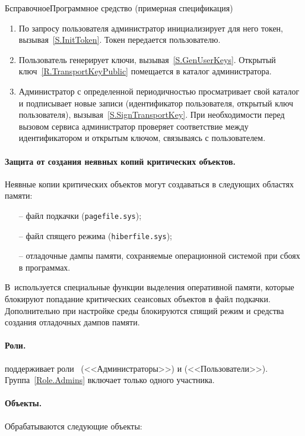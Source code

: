 \begin{appendix}{Б}{справочное}{Программное средство \CryptoDisk 
(примерная спецификация)}
\begin{enumerate}
\item
По запросу пользователя администратор инициализирует для него токен,
вызывая~\ref{S.InitToken}. Токен передается пользователю.

\item
Пользователь генерирует ключи, вызывая~\ref{S.GenUserKeys}.
Открытый ключ~\ref{R.TransportKeyPublic} 
помещается в каталог администратора.

\item
Администратор с определенной периодичностью просматривает свой каталог
и подписывает новые записи (идентификатор пользователя, 
открытый ключ пользователя), 
вызывая~\ref{S.SignTransportKey}.
При необходимости перед вызовом сервиса администратор 
проверяет соответствие между идентификатором
и открытым ключом, связываясь с пользователем.
\end{enumerate}

\paragraph*{Защита от создания неявных копий критических объектов.}
Неявные копии критических объектов 
могут создаваться в следующих областях памяти:
\begin{itemize}
\item[--]
файл подкачки (\texttt{pagefile.sys}); 
\item[--]
файл спящего режима (\texttt{hiberfile.sys});
\item[--]
отладочные дампы памяти, сохраняемые операционной системой 
при сбоях в программах.
\end{itemize}
В~\CryptoDisk используется специальные функции выделения
оперативной памяти, которые блокируют попадание критических сеансовых объектов
в файл подкачки.
Дополнительно при настройке среды блокируются спящий режим и 
средства создания отладочных дампов памяти.


\paragraph*{Роли.} 
\CryptoDisk поддерживает роли~ (<<Администраторы>>)
и  (<<Пользователи>>).
Группа~\ref{Role.Admins} включает только одного участника.

\paragraph*{Объекты.} 
Обрабатываются следующие объекты:


\end{appendix}
